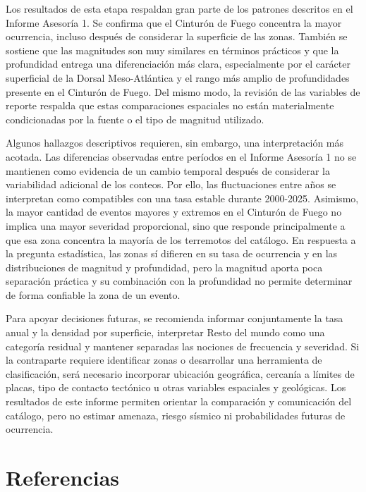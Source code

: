 \documentclass[
  spanish,
  letterpaper,
  DIV=11,
  numbers=noendperiod]{scrartcl}
\begin{document}
Los resultados de esta etapa respaldan gran parte de los patrones
descritos en el Informe Asesoría 1. Se confirma que el Cinturón de Fuego
concentra la mayor ocurrencia, incluso después de considerar la
superficie de las zonas. También se sostiene que las magnitudes son muy
similares en términos prácticos y que la profundidad entrega una
diferenciación más clara, especialmente por el carácter superficial de
la Dorsal Meso-Atlántica y el rango más amplio de profundidades presente
en el Cinturón de Fuego. Del mismo modo, la revisión de las variables de
reporte respalda que estas comparaciones espaciales no están
materialmente condicionadas por la fuente o el tipo de magnitud
utilizado.

Algunos hallazgos descriptivos requieren, sin embargo, una
interpretación más acotada. Las diferencias observadas entre períodos en
el Informe Asesoría 1 no se mantienen como evidencia de un cambio
temporal después de considerar la variabilidad adicional de los conteos.
Por ello, las fluctuaciones entre años se interpretan como compatibles
con una tasa estable durante 2000-2025. Asimismo, la mayor cantidad de
eventos mayores y extremos en el Cinturón de Fuego no implica una mayor
severidad proporcional, sino que responde principalmente a que esa zona
concentra la mayoría de los terremotos del catálogo. En respuesta a la
pregunta estadística, las zonas sí difieren en su tasa de ocurrencia y
en las distribuciones de magnitud y profundidad, pero la magnitud aporta
poca separación práctica y su combinación con la profundidad no permite
determinar de forma confiable la zona de un evento.

\enlargethispage{2.2\baselineskip}

Para apoyar decisiones futuras, se recomienda informar conjuntamente la
tasa anual y la densidad por superficie, interpretar Resto del mundo
como una categoría residual y mantener separadas las nociones de
frecuencia y severidad. Si la contraparte requiere identificar zonas o
desarrollar una herramienta de clasificación, será necesario incorporar
ubicación geográfica, cercanía a límites de placas, tipo de contacto
tectónico u otras variables espaciales y geológicas. Los resultados de
este informe permiten orientar la comparación y comunicación del
catálogo, pero no estimar amenaza, riesgo sísmico ni probabilidades
futuras de ocurrencia.

\newpage

\section{Referencias}\label{referencias}
\end{document}
